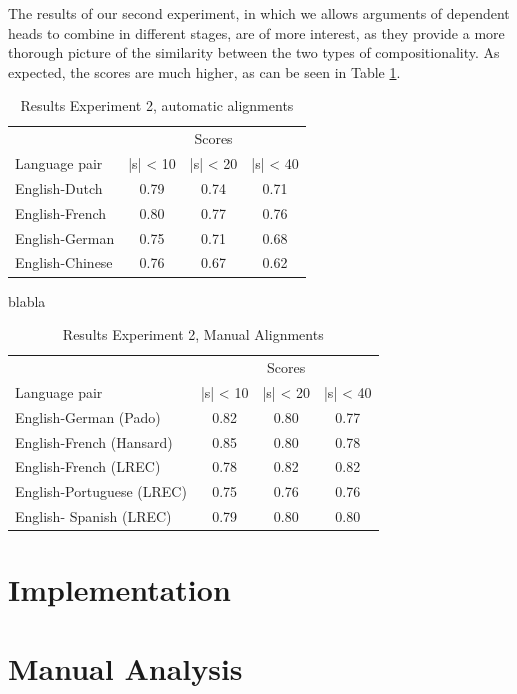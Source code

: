 \documentclass{report}
\theoremstyle{break}
\begin{document}
The results of our second experiment, in which we allows arguments of dependent heads to combine in different stages, are of more interest, as they provide a more thorough picture of the similarity between the two types of compositionality. As expected, the scores are much higher, as can be seen in Table \ref{tab:scores3}.

\begin{table}[!h]
\centering
\begin{tabular}{l|ccc}
& \multicolumn{3}{c}{Scores}\\
Language pair & |s| < 10 & |s| < 20 & |s| < 40\\
\hline
English-Dutch & 0.79 & 0.74 & 0.71 \\
English-French & 0.80 & 0.77 & 0.76\\
English-German & 0.75 & 0.71 & 0.68 \\
English-Chinese & 0.76 & 0.67 & 0.62\\
\end{tabular}
\caption{Results Experiment 2, automatic alignments}\label{tab:scores3}
\end{table}

blabla

\begin{table}[!h]
\centering
\begin{tabular}{l|ccc}
& \multicolumn{3}{c}{Scores}\\
Language pair & |s| < 10 & |s| < 20 & |s| < 40\\
\hline
English-German (Pado) & 0.82 & 0.80 & 0.77 \\
English-French (Hansard) & 0.85 & 0.80 & 0.78 \\
English-French (LREC) & 0.78 & 0.82 & 0.82 \\
English-Portuguese (LREC) & 0.75 & 0.76 & 0.76 \\
English- Spanish (LREC) & 0.79 & 0.80 & 0.80\\
\end{tabular}
\caption{Results Experiment 2, Manual Alignments}\label{tab:scores2}
\end{table}


\appendix
\chapter{Implementation}
\label{appendix:impl}

\chapter{Manual Analysis}
\label{appendix:analysis}




\end{document}
